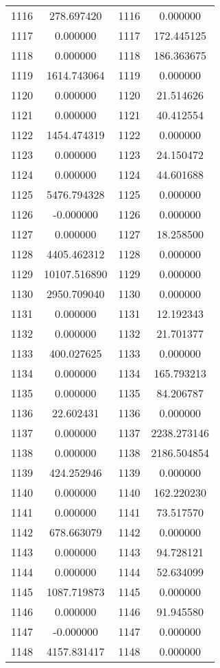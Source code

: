 \documentclass[12pt]{article}
\begin{document}
\begin{longtable}{@{}cccc@{}}
1116 & 278.697420 & 1116 & 0.000000 \\
1117 & 0.000000 & 1117 & 172.445125 \\
1118 & 0.000000 & 1118 & 186.363675 \\
1119 & 1614.743064 & 1119 & 0.000000 \\
1120 & 0.000000 & 1120 & 21.514626 \\
1121 & 0.000000 & 1121 & 40.412554 \\
1122 & 1454.474319 & 1122 & 0.000000 \\
1123 & 0.000000 & 1123 & 24.150472 \\
1124 & 0.000000 & 1124 & 44.601688 \\
1125 & 5476.794328 & 1125 & 0.000000 \\
1126 & -0.000000 & 1126 & 0.000000 \\
1127 & 0.000000 & 1127 & 18.258500 \\
1128 & 4405.462312 & 1128 & 0.000000 \\
1129 & 10107.516890 & 1129 & 0.000000 \\
1130 & 2950.709040 & 1130 & 0.000000 \\
1131 & 0.000000 & 1131 & 12.192343 \\
1132 & 0.000000 & 1132 & 21.701377 \\
1133 & 400.027625 & 1133 & 0.000000 \\
1134 & 0.000000 & 1134 & 165.793213 \\
1135 & 0.000000 & 1135 & 84.206787 \\
1136 & 22.602431 & 1136 & 0.000000 \\
1137 & 0.000000 & 1137 & 2238.273146 \\
1138 & 0.000000 & 1138 & 2186.504854 \\
1139 & 424.252946 & 1139 & 0.000000 \\
1140 & 0.000000 & 1140 & 162.220230 \\
1141 & 0.000000 & 1141 & 73.517570 \\
1142 & 678.663079 & 1142 & 0.000000 \\
1143 & 0.000000 & 1143 & 94.728121 \\
1144 & 0.000000 & 1144 & 52.634099 \\
1145 & 1087.719873 & 1145 & 0.000000 \\
1146 & 0.000000 & 1146 & 91.945580 \\
1147 & -0.000000 & 1147 & 0.000000 \\
1148 & 4157.831417 & 1148 & 0.000000 \\

\end{longtable}
\end{document}
